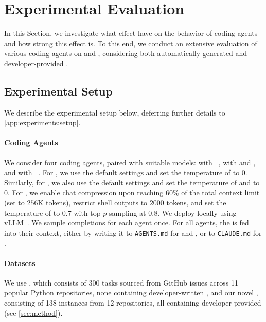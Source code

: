 \vspace{-1mm}
\section{Experimental Evaluation}
\label{sec:experiments}
\vspace{-1mm}

In this Section, we investigate what effect \agentsmds{} have on the behavior of coding agents and how strong this effect is. To this end, we conduct an extensive evaluation of various coding agents on \swebench{} and \planbench{}, considering both automatically generated and developer-provided \agentsmds{}.


\subsection{Experimental Setup}

We describe the experimental setup below, deferring further details to \cref{app:experiments:setup}.


\paragraph{Coding Agents}
We consider four coding agents, paired with suitable models: \claudecode{} \citep{ClaudeCodeDocsOverview} with \sonnet{}~\citep{sonnet45}, \codex{} \citep{openaiCodex2026} with \gptfive{} and \gptfivemini{} \citep{singh2025openaigpt5card}, and \qwencode{} \citep{QwenLMQwen3Coder} with \qwen{}~\citep{qwen3}.
For \claudecode{}, we use the default settings and set the temperature of \sonnet{} to $0$.
Similarly, for \codex{}, we also use the default settings and set the temperature of \gptfive{} and \gptfivemini{} to $0$.
For \qwencode{}, we enable chat compression upon reaching $60$\% of the total context limit (set to $256$K tokens), restrict shell outputs to $2000$ tokens, and set the temperature of \qwen{} to $0.7$ with top-$p$ sampling at $0.8$. We deploy \qwen{} locally using vLLM~\citep{vllm}. We sample completions for each agent once.
For all agents, the \agentsmd{} is fed into their context, either by writing it to \texttt{AGENTS.md} for \codex{} and \qwencode{}, or to \texttt{CLAUDE.md} for \claudecode{}.

\paragraph{Datasets}
We use \swebench{} \citep{swebench}, which consists of 300 tasks sourced from GitHub issues across 11 popular Python repositories, none containing developer-written \agentsmds{}, and our novel \planbench{}, consisting of 138 instances from 12 repositories, all containing developer-provided \agentsmds{} (see \cref{sec:method}).

